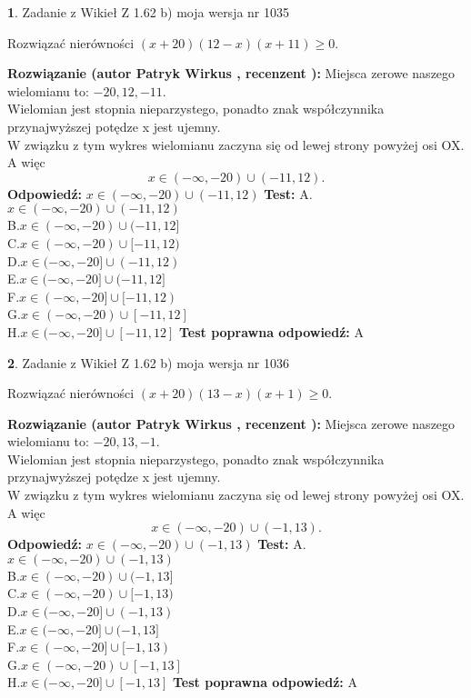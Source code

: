 \documentclass[12pt, a4paper]{article}
\theoremstyle{definition} %
\newtheorem{zad}{}
\newcommand{\zadStart}[1]{\begin{zad}#1\newline}
\newcommand{\zadStop}{\end{zad}}
\newcommand{\rozwStart}[2]{\noindent \textbf{Rozwiązanie (autor #1 , recenzent #2): }\newline}
\newcommand{\rozwStop}{\newline}
\newcommand{\odpStart}{\noindent \textbf{Odpowiedź:}\newline}
\newcommand{\odpStop}{\newline}
\newcommand{\testStart}{\noindent \textbf{Test:}\newline}
\newcommand{\testStop}{\newline}
\newcommand{\kluczStart}{\noindent \textbf{Test poprawna odpowiedź:}\newline}
\newcommand{\kluczStop}{\newline}
\begin{document}
\zadStart{Zadanie z Wikieł Z 1.62 b) moja wersja nr 1035}

Rozwiązać nierówności $(x+20)(12-x)(x+11)\ge0$.
\zadStop
\rozwStart{Patryk Wirkus}{}
Miejsca zerowe naszego wielomianu to: $-20, 12, -11$.\\
Wielomian jest stopnia nieparzystego, ponadto znak współczynnika przy\linebreak najwyższej potędze x jest ujemny.\\ W związku z tym wykres wielomianu zaczyna się od lewej strony powyżej osi OX. A więc $$x \in (-\infty,-20) \cup (-11,12).$$
\rozwStop
\odpStart
$x \in (-\infty,-20) \cup (-11,12)$
\odpStop
\testStart
A.$x \in (-\infty,-20) \cup (-11,12)$\\
B.$x \in (-\infty,-20) \cup (-11,12]$\\
C.$x \in (-\infty,-20) \cup [-11,12)$\\
D.$x \in (-\infty,-20] \cup (-11,12)$\\
E.$x \in (-\infty,-20] \cup (-11,12]$\\
F.$x \in (-\infty,-20] \cup [-11,12)$\\
G.$x \in (-\infty,-20) \cup [-11,12]$\\
H.$x \in (-\infty,-20] \cup [-11,12]$
\testStop
\kluczStart
A
\kluczStop



\zadStart{Zadanie z Wikieł Z 1.62 b) moja wersja nr 1036}

Rozwiązać nierówności $(x+20)(13-x)(x+1)\ge0$.
\zadStop
\rozwStart{Patryk Wirkus}{}
Miejsca zerowe naszego wielomianu to: $-20, 13, -1$.\\
Wielomian jest stopnia nieparzystego, ponadto znak współczynnika przy\linebreak najwyższej potędze x jest ujemny.\\ W związku z tym wykres wielomianu zaczyna się od lewej strony powyżej osi OX. A więc $$x \in (-\infty,-20) \cup (-1,13).$$
\rozwStop
\odpStart
$x \in (-\infty,-20) \cup (-1,13)$
\odpStop
\testStart
A.$x \in (-\infty,-20) \cup (-1,13)$\\
B.$x \in (-\infty,-20) \cup (-1,13]$\\
C.$x \in (-\infty,-20) \cup [-1,13)$\\
D.$x \in (-\infty,-20] \cup (-1,13)$\\
E.$x \in (-\infty,-20] \cup (-1,13]$\\
F.$x \in (-\infty,-20] \cup [-1,13)$\\
G.$x \in (-\infty,-20) \cup [-1,13]$\\
H.$x \in (-\infty,-20] \cup [-1,13]$
\testStop
\kluczStart
A
\kluczStop
\end{document}
